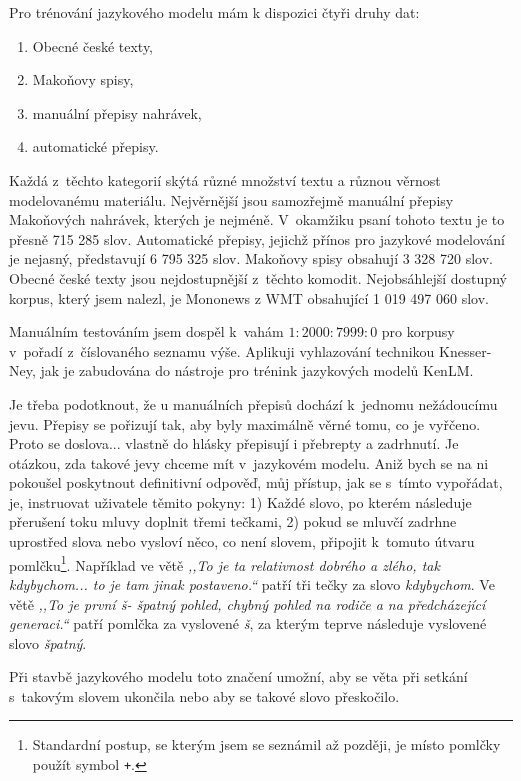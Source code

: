 Pro trénování jazykového modelu mám k dispozici čtyři druhy dat:
\begin{enumerate}
\item{Obecné české texty,}
\item{Makoňovy spisy,}
\item{manuální přepisy nahrávek,}
\item{automatické přepisy.}
\end{enumerate}

Každá z~těchto kategorií skýtá různé množství textu a různou věrnost
modelovanému materiálu. Nejvěrnější jsou samozřejmě manuální přepisy Makoňových
nahrávek, kterých je nejméně. V~okamžiku psaní tohoto textu je to přesně 715 285
slov. Automatické přepisy, jejichž přínos pro jazykové modelování je nejasný,
představují 6 795 325 slov. Makoňovy spisy obsahují 3 328 720 slov. Obecné české
texty jsou nejdostupnější z~těchto komodit. Nejobsáhlejší dostupný korpus, který
jsem nalezl, je Mononews z WMT\cite{wmt19} obsahující 1 019 497 060 slov.

Manuálním testováním jsem dospěl k~vahám $1 : 2000 : 7999 : 0$ pro korpusy
v~pořadí z~číslovaného seznamu výše. Aplikuji vyhlazování technikou
Knesser-Ney\cite{chen1999empirical}, jak je zabudována do nástroje pro trénink
jazykových modelů KenLM\cite{heafield2011kenlm}.

Je třeba podotknout, že u manuálních přepisů dochází k~jednomu
nežádoucímu jevu. Přepisy se pořizují tak, aby byly maximálně věrné tomu, co je
vyřčeno. Proto se doslova... vlastně do hlásky přepisují i přebrepty a zadrhnutí.
Je otázkou, zda takové jevy chceme mít v~jazykovém modelu. Aniž bych se na ni
pokoušel poskytnout definitivní odpověď, můj přístup, jak se s~tímto vypořádat,
je, instruovat uživatele těmito pokyny: 1) Každé slovo, po kterém následuje přerušení toku
mluvy doplnit třemi tečkami,
2) pokud se mluvčí zadrhne uprostřed slova nebo vysloví něco, co není slovem,
připojit k~tomuto útvaru pomlčku\footnote{Standardní postup, se kterým jsem se
seznámil až později, je místo pomlčky použít symbol \texttt{+}.}. Například ve větě {\em ,,To je ta relativnost
dobrého a zlého, tak kdybychom... to je tam jinak postaveno.``} patří tři tečky
za slovo {\em kdybychom}. Ve větě {\em ,,To je první š- špatný pohled, chybný pohled na rodiče a na
předcházející generaci.``} patří pomlčka za vyslovené {\em š}, za kterým
teprve následuje vyslovené slovo {\em špatný}.

Při stavbě jazykového modelu toto značení umožní, aby se věta při setkání
s~takovým slovem ukončila nebo aby se takové slovo přeskočilo.


